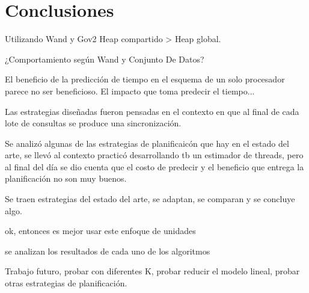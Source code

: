 \chapter{Conclusiones}
\label{cap:conclu}

Utilizando Wand y Gov2 Heap compartido > Heap global.

¿Comportamiento según Wand y Conjunto De Datos? 

El beneficio de la predicción de tiempo en el esquema de un solo procesador parece no ser beneficioso. 
El impacto que toma predecir el tiempo...

Las estrategias diseñadas fueron pensadas en el contexto en que al final de cada lote de consultas se produce una sincronización.

Se analizó algunas de las estrategias de planificaicón que hay en el estado del arte, se llevó al contexto practicó desarrollando tb un estimador de threads, pero al final del día se dio cuenta que el costo de predecir y el beneficio que entrega la planificación no son muy buenos.

Se traen estrategias del estado del arte, se adaptan, se comparan y se concluye algo.

ok, entonces es mejor usar este enfoque de unidades

se analizan los resultados de cada uno de los algoritmos

Trabajo futuro, probar con diferentes K, probar reducir el modelo lineal, probar otras estrategias de planificación.